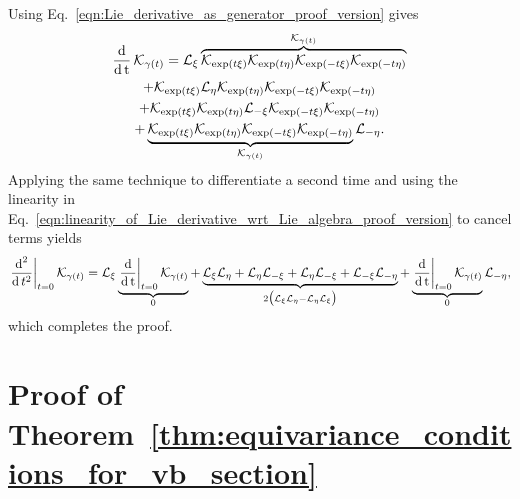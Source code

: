 \documentclass[twoside,11pt]{article}
\begin{document}
    Using Eq.~\ref{eqn:Lie_derivative_as_generator_proof_version} gives
    \begin{multline}
        \operatorname{\frac{\operatorname{\mathrm{d}}}{\operatorname{\mathrm{d}} t}} {\mathcal{K}}_{\gamma(t)}
        = {\mathcal{L}}_{\xi} \overbrace{{\mathcal{K}}_{\exp(t\xi)}{\mathcal{K}}_{\exp(t\eta)}{\mathcal{K}}_{\exp(-t\xi)}{\mathcal{K}}_{\exp(-t\eta)}}^{{\mathcal{K}}_{\gamma(t)}} \\
        + {\mathcal{K}}_{\exp(t\xi)} {\mathcal{L}}_{\eta} {\mathcal{K}}_{\exp(t\eta)}{\mathcal{K}}_{\exp(-t\xi)}{\mathcal{K}}_{\exp(-t\eta)} \\
        + {\mathcal{K}}_{\exp(t\xi)}{\mathcal{K}}_{\exp(t\eta)}{\mathcal{L}}_{-\xi}{\mathcal{K}}_{\exp(-t\xi)}{\mathcal{K}}_{\exp(-t\eta)} \\
        + \underbrace{{\mathcal{K}}_{\exp(t\xi)}{\mathcal{K}}_{\exp(t\eta)}{\mathcal{K}}_{\exp(-t\xi)}{\mathcal{K}}_{\exp(-t\eta)}}_{{\mathcal{K}}_{\gamma(t)}}{\mathcal{L}}_{-\eta}.
    \end{multline}
    Applying the same technique to differentiate a second time and using the linearity in Eq.~\ref{eqn:linearity_of_Lie_derivative_wrt_Lie_algebra_proof_version} to cancel terms yields
    \begin{equation}
        \left.\frac{\operatorname{\mathrm{d}}^2}{\operatorname{\mathrm{d}} t^2}\right\vert_{t=0} {\mathcal{K}}_{\gamma(t)}
        = {\mathcal{L}}_{\xi} \underbrace{\left.\operatorname{\frac{\operatorname{\mathrm{d}}}{\operatorname{\mathrm{d}} t}}\right\vert_{t=0} {\mathcal{K}}_{\gamma(t)}}_{0}
        + \underbrace{
        {\mathcal{L}}_{\xi}{\mathcal{L}}_{\eta} 
        + {\mathcal{L}}_{\eta}{\mathcal{L}}_{-\xi} 
        + {\mathcal{L}}_{\eta}{\mathcal{L}}_{-\xi}
        + {\mathcal{L}}_{-\xi}{\mathcal{L}}_{-\eta}
        }_{2\big( {\mathcal{L}}_{\xi}{\mathcal{L}}_{\eta} - {\mathcal{L}}_{\eta} {\mathcal{L}}_{\xi} \big)}
        + \underbrace{\left.\operatorname{\frac{\operatorname{\mathrm{d}}}{\operatorname{\mathrm{d}} t}}\right\vert_{t=0} {\mathcal{K}}_{\gamma(t)}}_{0} {\mathcal{L}}_{-\eta},
    \end{equation}
    which completes the proof.
\hfill\qedsymbol

\section{Proof of Theorem~\ref{thm:equivariance_conditions_for_vb_section}}
\label{app:equivariance_conditions_for_vb_section}
\end{document}
